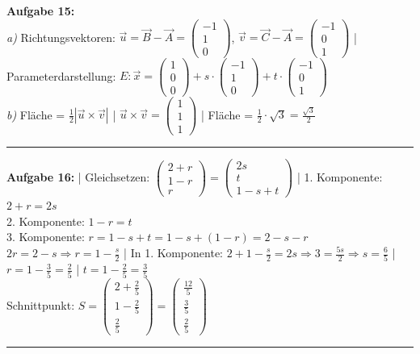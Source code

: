 \documentclass[12pt,a4paper]{article}
\newcommand{\vek}[1]{\vec{#1}}
\begin{document}
\textbf{Aufgabe 15:} \\
\textit{a)} Richtungsvektoren: $\vek{u} = \vek{B} - \vek{A} = \begin{pmatrix}-1\\1\\0\end{pmatrix}$, $\vek{v} = \vek{C} - \vek{A} = \begin{pmatrix}-1\\0\\1\end{pmatrix}$ |
Parameterdarstellung: $E: \vek{x} = \begin{pmatrix}1\\0\\0\end{pmatrix} + s \cdot \begin{pmatrix}-1\\1\\0\end{pmatrix} + t \cdot \begin{pmatrix}-1\\0\\1\end{pmatrix}$ \\
\textit{b)} Fläche = $\frac{1}{2} |\vek{u} \times \vek{v}|$ |
$\vek{u} \times \vek{v} = \begin{pmatrix}1\\1\\1\end{pmatrix}$ |
Fläche = $\frac{1}{2} \cdot \sqrt{3} = \frac{\sqrt{3}}{2}$
\begin{center}\rule{0.8\linewidth}{0.4pt}\end{center}

\textbf{Aufgabe 16:} |
Gleichsetzen: $\begin{pmatrix}2+r\\1-r\\r\end{pmatrix} = \begin{pmatrix}2s\\t\\1-s+t\end{pmatrix}$ |
1. Komponente: $2+r = 2s$ \\
2. Komponente: $1-r = t$ \\
3. Komponente: $r = 1-s+t = 1-s+(1-r) = 2-s-r$ \\
$2r = 2-s \Rightarrow r = 1 - \frac{s}{2}$ |
In 1. Komponente: $2+1-\frac{s}{2} = 2s \Rightarrow 3 = \frac{5s}{2} \Rightarrow s = \frac{6}{5}$ |
$r = 1 - \frac{3}{5} = \frac{2}{5}$ |
$t = 1 - \frac{2}{5} = \frac{3}{5}$ \\
Schnittpunkt: $S = \begin{pmatrix}2+\frac{2}{5}\\1-\frac{2}{5}\\\frac{2}{5}\end{pmatrix} = \begin{pmatrix}\frac{12}{5}\\\frac{3}{5}\\\frac{2}{5}\end{pmatrix}$
\begin{center}\rule{0.8\linewidth}{0.4pt}\end{center}
\end{document}
